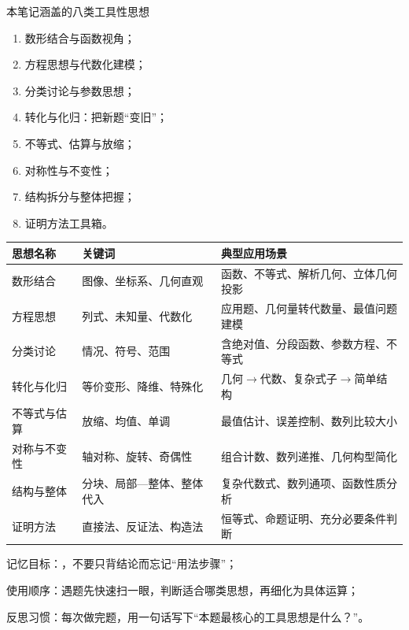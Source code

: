 \documentclass[a4paper,11pt]{ctexart}
\begin{document}
\begin{summarybox}{本笔记涵盖的八类工具性思想}
\begin{enumerate}
  \item 数形结合与函数视角；
  \item 方程思想与代数化建模；
  \item 分类讨论与参数思想；
  \item 转化与化归：把新题“变旧”；
  \item 不等式、估算与放缩；
  \item 对称性与不变性；
  \item 结构拆分与整体把握；
  \item 证明方法工具箱。
\end{enumerate}
\end{summarybox}

\begin{center}

\vspace{0.5em}
\begin{tabular}{p{} p{} p{}}
\hline
\textbf{思想名称} & \textbf{关键词} & \textbf{典型应用场景} \\
\hline
数形结合 & 图像、坐标系、几何直观 & 函数、不等式、解析几何、立体几何投影 \\
方程思想 & 列式、未知量、代数化 & 应用题、几何量转代数量、最值问题建模 \\
分类讨论 & 情况、符号、范围 & 含绝对值、分段函数、参数方程、不等式 \\
转化与化归 & 等价变形、降维、特殊化 & 几何$\rightarrow$代数、复杂式子$\rightarrow$简单结构 \\
不等式与估算 & 放缩、均值、单调 & 最值估计、误差控制、数列比较大小 \\
对称与不变性 & 轴对称、旋转、奇偶性 & 组合计数、数列递推、几何构型简化 \\
结构与整体 & 分块、局部—整体、整体代入 & 复杂代数式、数列通项、函数性质分析 \\
证明方法 & 直接法、反证法、构造法 & 恒等式、命题证明、充分必要条件判断 \\
\hline
\end{tabular}
\end{center}

\begin{focuspoints}
  \item 记忆目标：，不要只背结论而忘记“用法步骤”；
  \item 使用顺序：遇题先快速扫一眼，判断适合哪类思想，再细化为具体运算；
  \item 反思习惯：每次做完题，用一句话写下“本题最核心的工具思想是什么？”。
\end{focuspoints}
\end{document}
